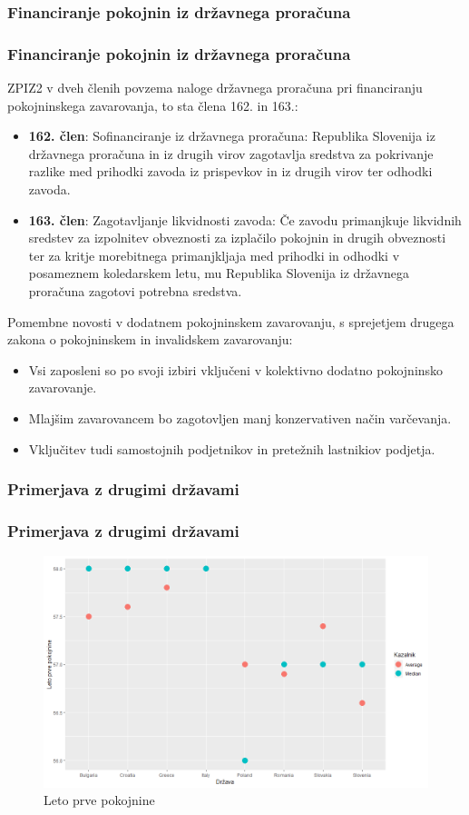 \documentclass[10pt]{beamer}
\begin{document}
\begin{frame}
\subsubsection[Financiranje pokojnin iz državnega proračuna]{Financiranje pokojnin iz državnega proračuna}
	\frametitle{Financiranje pokojnin iz državnega proračuna}
	ZPIZ2 v dveh členih povzema naloge državnega proračuna pri financiranju pokojninskega zavarovanja, to sta 	člena 162. in 163.:
	\begin{itemize}
	\item \textbf{162. člen}: Sofinanciranje iz državnega proračuna: Republika Slovenija iz državnega proračuna in iz drugih virov zagotavlja sredstva za pokrivanje razlike med 				prihodki zavoda iz prispevkov in iz drugih virov ter odhodki zavoda.
	\item \textbf{163. člen}: Zagotavljanje likvidnosti zavoda: Če zavodu primanjkuje likvidnih sredstev za izpolnitev obveznosti za izplačilo pokojnin in drugih obveznosti 				ter za kritje morebitnega primanjkljaja med prihodki in odhodki v posameznem koledarskem letu, mu Republika Slovenija iz državnega proračuna zagotovi potrebna 				sredstva.
\end{itemize}

Pomembne novosti v dodatnem pokojninskem zavarovanju, s sprejetjem drugega zakona o  pokojninskem in invalidskem zavarovanju:
\begin{itemize}
	\item Vsi zaposleni so po svoji izbiri vključeni v kolektivno dodatno pokojninsko zavarovanje.
	\item Mlajšim zavarovancem bo zagotovljen manj konzervativen način varčevanja.
	\item Vključitev tudi samostojnih podjetnikov in pretežnih lastnikiov podjetja.
\end{itemize}
\end{frame}

\begin{frame}
\subsubsection[Primerjava z drugimi državami]{Primerjava z drugimi državami}
\frametitle{Primerjava z drugimi državami}
\begin{figure}[h]
\centering
\includegraphics[height = 7 cm]{leto_prve_pokojnine.png}
\caption{Leto prve pokojnine}
\label{Slika 4}
\end{figure}
\end{frame}
\end{document}
